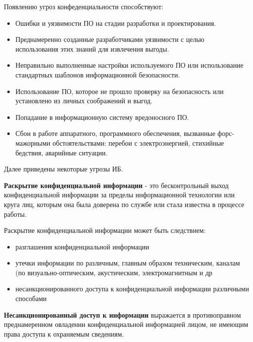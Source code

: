 Появлению угроз конфеденциальности способствуют: 
\begin{itemize}


    \item Ошибки и уязвимости ПО на стадии разработки и проектирования.

    \item Преднамеренно созданные разработчиками уязвимости с целью использования этих знаний для извлечения выгоды.

    \item Неправильно выполненные настройки используемого ПО или использование стандартных шаблонов информационной безопасности.

    \item Использование ПО, которое не прошло проверку на безопасность или установлено из личных соображений и выгод.

    \item Попадание в информационную систему вредоносного ПО.

    \item Сбои в работе аппаратного, программного обеспечения, вызванные форс-мажорными обстоятельствами: перебои с электроэнергией, стихийные бедствия, аварийные ситуации.

\end{itemize}

Далее приведены некоторые угрозы ИБ.

\textbf{Раскрытие конфиденциальной информации} - это бесконтрольный выход конфиденциальной
информации за пределы информационной технологии или круга лиц, которым она была доверена по
службе или стала известна в процессе работы.

Раскрытие конфиденциальной информации может быть следствием:
\begin{itemize}
    \item разглашения конфиденциальной информации
    \item утечки информации по различным, главным образом техническим, каналам
        (по визуально-оптическим, акустическим, электромагнитным и др
    \item несанкционированного доступа к конфиденциальной информации различными способами
\end{itemize}

\textbf{Несанкционированный доступ к информации} выражается в противоправном преднамеренном
овладении конфиденциальной информацией лицом, не имеющим права доступа к охраняемым сведениям.

